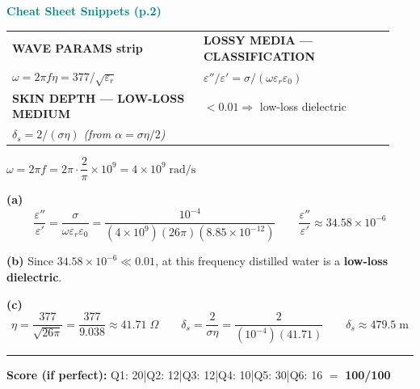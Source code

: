 \documentclass[11pt,letterpaper]{article}
\begin{document}
\begin{cssnip}
\textbf{\small\textcolor{teal}{Cheat Sheet Snippets (p.2)}}\\[3pt]
\begin{tabular}{@{}p{0.47\linewidth}p{0.47\linewidth}@{}}
\textbf{WAVE PARAMS strip} & \textbf{LOSSY MEDIA --- CLASSIFICATION}\\
$\omega=2\pi f$\quad $\eta=377/\sqrt{\varepsilon_r}$ &
$\varepsilon''/\varepsilon'=\sigma/(\omega\varepsilon_r\varepsilon_0)$\\[3pt]
\textbf{SKIN DEPTH --- LOW-LOSS MEDIUM} & $<0.01\Rightarrow$ low-loss dielectric\\
$\delta_s=2/(\sigma\eta)$ \textit{(from $\alpha=\sigma\eta/2$)} & \\
\end{tabular}
\end{cssnip}

\begin{notebox}
$\omega=2\pi f=2\pi\cdot\dfrac{2}{\pi}\times10^9=4\times10^9\;\text{rad/s}$
\end{notebox}

\textbf{(a)}
\[\frac{\varepsilon''}{\varepsilon'}=\frac{\sigma}{\omega\varepsilon_r\varepsilon_0}
=\frac{10^{-4}}{(4\times10^9)(26\pi)(8.85\times10^{-12})}
\qquad\boxed{\frac{\varepsilon''}{\varepsilon'}\approx34.58\times10^{-6}}\]

\textbf{(b)} Since $34.58\times10^{-6}\ll0.01$, at this frequency distilled water is a \textbf{low-loss dielectric}.

\textbf{(c)}
\[\eta=\frac{377}{\sqrt{26\pi}}=\frac{377}{9.038}\approx41.71\;\Omega
\qquad
\delta_s=\frac{2}{\sigma\eta}=\frac{2}{(10^{-4})(41.71)}
\qquad\boxed{\delta_s\approx479.5\;\text{m}}\]

\vspace{12pt}
\hrule
\vspace{6pt}
\begin{center}
{\small\textbf{Score (if perfect):}
Q1: 20\;|\;Q2: 12\;|\;Q3: 12\;|\;Q4: 10\;|\;Q5: 30\;|\;Q6: 16 $=$ \textbf{100/100}}
\end{center}
\end{document}
